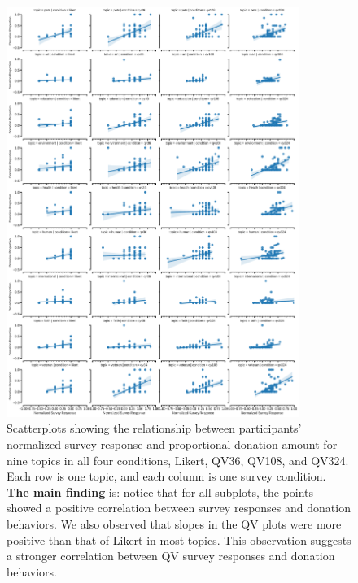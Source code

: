 \begin{figure}[htpb]
    \centering
    \includegraphics[width=0.85\textwidth, keepaspectratio=true]{content/image/vote_donation_covariates.pdf}
    \caption{
      Scatterplots showing the relationship between participants' normalized survey response and proportional donation amount for nine topics in all four conditions, Likert, QV36, QV108, and QV324. Each row is one topic, and each column is one survey condition. \textbf{The main finding} is: notice that for all subplots, the points showed a positive correlation between survey responses and donation behaviors. We also observed that slopes in the QV plots were more positive than that of Likert in most topics. This observation suggests a stronger correlation between QV survey responses and donation behaviors.
    }
    \label{fig:topic_covariate_exp1}
\end{figure}

